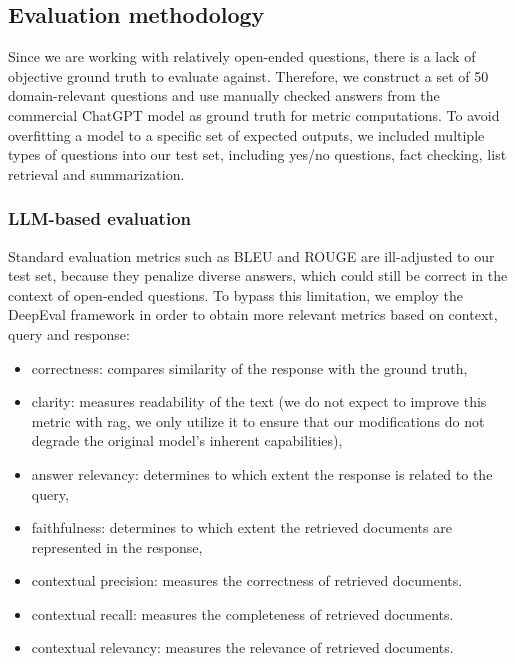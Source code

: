 \documentclass[fleqn,moreauthors,10pt]{ds_report}
\begin{document}
\subsection*{Evaluation methodology}

Since we are working with relatively open-ended questions, there is a lack of objective ground truth to evaluate against. Therefore, we construct a set of 50 domain-relevant questions and use manually checked answers from the commercial ChatGPT model as ground truth for metric computations. To avoid overfitting a model to a specific set of expected outputs, we included multiple types of questions into our test set, including yes/no questions, fact checking, list retrieval and summarization. 


\subsubsection*{LLM-based evaluation}

Standard evaluation metrics such as BLEU and ROUGE are ill-adjusted to our test set, because they penalize diverse answers, which could still be correct in the context of open-ended questions. To bypass this limitation, we employ the DeepEval framework \cite{deepeval} in order to obtain more relevant metrics based on context, query and response:

\begin{itemize}
	\item correctness: compares similarity of the response with the ground truth,
	\item clarity: measures readability of the text (we do not expect to improve this metric with \ac{rag}, we only utilize it to ensure that our modifications do not degrade the original model's inherent capabilities),
	\item answer relevancy: determines to which extent the response is related to the query,
	\item faithfulness: determines to which extent the retrieved documents are represented in the response,
	\item contextual precision: measures the correctness of retrieved documents.
	\item contextual recall: measures the completeness of retrieved documents.
	\item contextual relevancy: measures the relevance of retrieved documents.
\end{itemize} 
\end{document}

